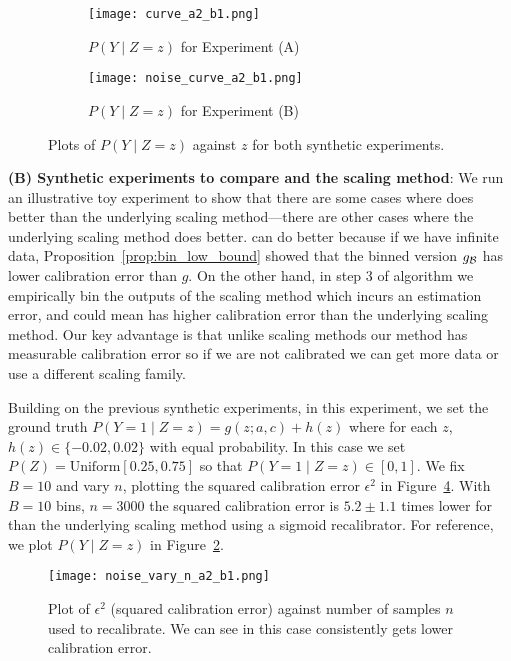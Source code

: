 \begin{figure}
  \centering
  \centering
     \begin{subfigure}[b]{0.48\textwidth}
         \centering
         \texttt{[image: curve\_a2\_b1.png]}
         \caption{$P(Y \mid Z=z)$ for Experiment (A)
         }
         \label{fig:well-spec-curve}
     \end{subfigure}
     \hfill
     \begin{subfigure}[b]{0.48\textwidth}
         \centering
         \texttt{[image: noise\_curve\_a2\_b1.png]}
         \caption{$P(Y \mid Z=z)$ for Experiment (B)
         }
         \label{fig:noisy-spec-curve}
     \end{subfigure}
  \caption{
    Plots of $P(Y \mid Z=z)$ against $z$ for both synthetic experiments.
}
  \label{fig:p_y_z_plots}
\end{figure}


\textbf{(B) Synthetic experiments to compare \ourcal{} and the scaling method}: We run an illustrative toy experiment to show that there are some cases where \ourcal{} does better than the underlying scaling method---there are other cases where the underlying scaling method does better. \ourcal{} can do better because if we have infinite data, Proposition~\ref{prop:bin_low_bound} showed that the binned version $g_{\mathcal{B}{}}$ has lower calibration error than $g$. On the other hand, in step 3 of \ourcal{} algorithm we empirically bin the outputs of the scaling method which incurs an estimation error, and could mean \ourcal{} has higher calibration error than the underlying scaling method. Our key advantage is that unlike scaling methods our method has measurable calibration error so if we are not calibrated we can get more data or use a different scaling family.

Building on the previous synthetic experiments, in this experiment, we set the ground truth $P(Y = 1 \mid Z=z) = g(z; a, c) + h(z)$ where for each $z$, $h(z) \in \{-0.02, 0.02\}$ with equal probability. In this case we set $P(Z) = \mbox{Uniform}[0.25, 0.75]$ so that $P(Y = 1 \mid Z=z) \in [0, 1]$. We fix $B=10$ and vary $n$, plotting the squared calibration error $\epsilon^2$ in Figure~\ref{fig:well-spec-vary-b}. With $B=10$ bins, $n = 3000$ the squared calibration error is $5.2 \pm 1.1$ times lower for \ourcal{} than the underlying scaling method using a sigmoid recalibrator. For reference, we plot $P(Y \mid Z = z)$ in Figure~\ref{fig:noisy-spec-curve}.

\begin{figure}
  \centering
  \texttt{[image: noise\_vary\_n\_a2\_b1.png]}
  \caption{Plot of $\epsilon^2$ (squared calibration error) against number of samples $n$ used to recalibrate. We can see in this case \ourcal{} consistently gets lower calibration error.
  }
  \label{fig:well-spec-vary-b}
\end{figure}
